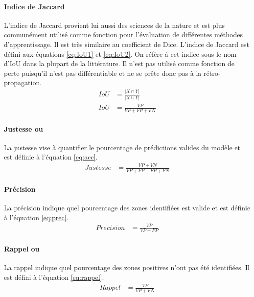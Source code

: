       \paragraph{Indice de Jaccard} L'indice de Jaccard provient lui aussi des sciences de la nature \parencite{jaccard_distribution_1901} et est plus communément utilisé comme fonction pour l'évaluation de différentes méthodes d'apprentissage. Il est très similaire au coefficient de Dice. L'indice de Jaccard est défini aux équations \ref{eq:IoU1} et \ref{eq:IoU2}. On réfère à cet indice sous le nom d'\ac{IoU} dans la plupart de la littérature. Il n'est pas utilisé comme fonction de perte puisqu'il n'est pas différentiable et ne se prête donc pas à la rétro-propagation.
      \begin{align} 
        IoU & = \frac{\lvert X \cap Y \rvert}{\lvert X \cup Y \rvert}\label{eq:IoU1} \\
        IoU & = \frac{VP}{VP + FP + FN}\label{eq:IoU2}
      \end{align}
      \paragraph{Justesse ou  \fg{}} 
      La justesse vise à quantifier le pourcentage de prédictions valides du modèle et est définie à l'équation \ref{eq:acc}\parencite{wallach_deep_2024}.
      \begin{align}
        Justesse & = \frac{VP+VN}{VP + FP + FP + FN}\label{eq:acc}
      \end{align}
      \paragraph{Précision}
      La précision indique quel pourcentage des zones identifiées est valide et est définie à l'équation \ref{eq:prec}\parencite{wallach_deep_2024}.
      \begin{align}
        Precision & = \frac{VP}{VP + FP}\label{eq:prec}
      \end{align}
      \paragraph{Rappel ou  \fg{}}
      La rappel indique quel pourcentage des zones positives n'ont pas été identifiées. Il est défini à l'équation \ref{eq:rappel}\parencite{wallach_deep_2024}.
      \begin{align}
        Rappel & = \frac{VP}{VP + FN}\label{eq:rappel}
      \end{align}
